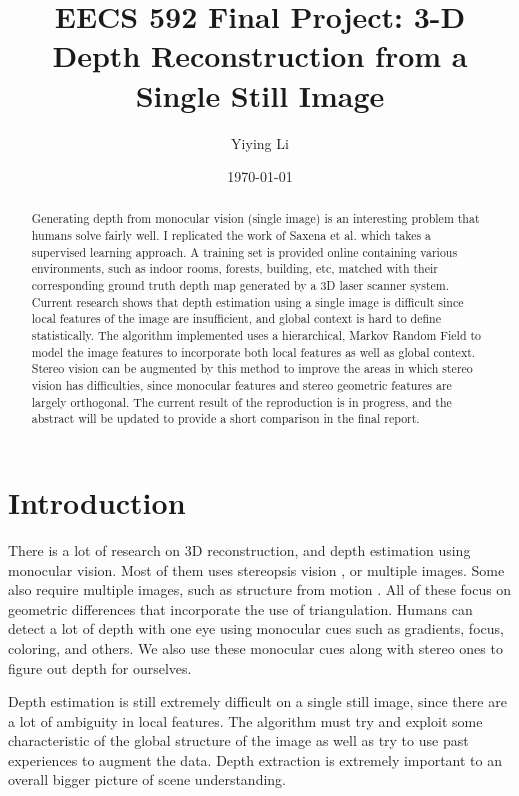\documentclass[journal]{IEEEtran}
\title{EECS 592 Final Project: 3-D Depth Reconstruction from a Single Still Image}
\author{Yiying Li}
\date{\today}
\begin{document}
\maketitle

\begin{abstract}
Generating depth from monocular vision (single image) is an interesting problem that humans solve fairly well. I replicated the work of Saxena et al. \cite{saxena2008} which takes a supervised learning approach. A training set is provided online containing various environments, such as indoor rooms, forests, building, etc, matched with their corresponding ground truth depth map generated by a 3D laser scanner system. Current research shows that depth estimation using a single image is difficult since local features of the image are insufficient, and global context is hard to define statistically. The algorithm implemented uses a hierarchical, Markov Random Field to model the image features to incorporate both local features as well as global context. Stereo vision can be augmented by this method to improve the areas in which stereo vision has difficulties, since monocular features and stereo geometric features are largely orthogonal. The current result of the reproduction is in progress, and the abstract will be updated to provide a short comparison in the final report.
\end{abstract}

\section{Introduction}
There is a lot of research on 3D reconstruction, and depth estimation using monocular vision. Most of them uses stereopsis vision \cite{scharstein2003}, or multiple images. Some also require multiple images, such as structure from motion \cite{Forsyth:2002:CVM:580035}. All of these focus on geometric differences that incorporate the use of triangulation. Humans can detect a lot of depth with one eye using monocular cues such as gradients, focus, coloring, and others. We also use these monocular cues along with stereo ones to figure out depth for ourselves. 

Depth estimation is still extremely difficult on a single still image, since there are a lot of ambiguity in local features. The algorithm must try and exploit some characteristic of the global structure of the image as well as try to use past experiences to augment the data. Depth extraction is extremely important to an overall bigger picture of scene understanding. 
\end{document}
